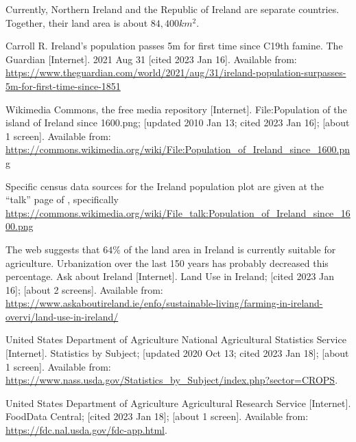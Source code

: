 \documentclass[12pt]{iopart}
\begin{document}
\begin{thebibliography}{99}
Currently, Northern Ireland and the Republic of Ireland are separate countries.  Together, their land area is about $84,400km^2$.

Carroll R.
Ireland’s population passes 5m for first time since C19th famine.
The Guardian [Internet].
2021 Aug 31 [cited 2023 Jan 16].
Available from: \url{https://www.theguardian.com/world/2021/aug/31/ireland-population-surpasses-5m-for-first-time-since-1851}

Wikimedia Commons, the free media repository [Internet].
File:Population of the island of Ireland since 1600.png;
[updated 2010 Jan 13; cited 2023 Jan 16]; [about 1 screen].
Available from: \url{https://commons.wikimedia.org/wiki/File:Population\_of\_Ireland\_since\_1600.png}

Specific census data sources for the Ireland population plot are given at the ``talk'' page of \cite{pop_image}, specifically
\url{https://commons.wikimedia.org/wiki/File\_talk:Population\_of\_Ireland\_since\_1600.png}

The web suggests that $64\%$ of the land area in Ireland is currently suitable for agriculture.  Urbanization over the last 150 years has probably decreased this percentage.  
Ask about Ireland [Internet].
Land Use in Ireland; [cited 2023 Jan 16]; [about 2 screens].
Available from: \url{https://www.askaboutireland.ie/enfo/sustainable-living/farming-in-ireland-overvi/land-use-in-ireland/}

United States Department of Agriculture National Agricultural Statistics Service [Internet].
Statistics by Subject; 
[updated 2020 Oct 13; cited 2023 Jan 18]; [about 1 screen].
Available from: \url{https://www.nass.usda.gov/Statistics_by_Subject/index.php?sector=CROPS}.  

United States Department of Agriculture Agricultural Research Service [Internet].
FoodData Central; 
[cited 2023 Jan 18]; [about 1 screen].
Available from: \url{https://fdc.nal.usda.gov/fdc-app.html}.  


\end{thebibliography}
\end{document}
